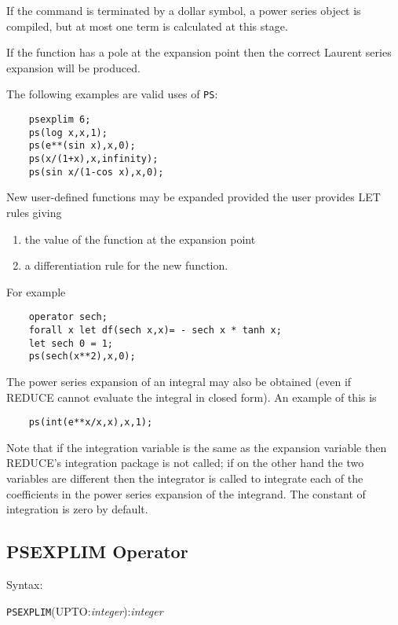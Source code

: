 If the command is terminated by a dollar symbol, a power series object
is compiled, but at most one term is calculated at this stage.

If the function has a pole at the expansion point then the correct
Laurent series expansion will be produced.

\noindent The following examples are valid uses of {\tt PS}:
\begin{verbatim}
    psexplim 6;
    ps(log x,x,1);
    ps(e**(sin x),x,0);
    ps(x/(1+x),x,infinity);
    ps(sin x/(1-cos x),x,0);
\end{verbatim}

New user-defined functions may be expanded provided the user provides
LET rules giving

\begin{enumerate}
\item the value of the function at the expansion point
\item a differentiation rule for the new function.
\end{enumerate}

\noindent For example
\begin{verbatim}
    operator sech;
    forall x let df(sech x,x)= - sech x * tanh x;
    let sech 0 = 1;
    ps(sech(x**2),x,0);
\end{verbatim}
 
The power series expansion of an integral may also be obtained (even if
REDUCE cannot evaluate the integral in closed form).  An example of
this is

\begin{verbatim}
    ps(int(e**x/x,x),x,1);
\end{verbatim}
 
Note that if the integration variable is the same as the expansion
variable then REDUCE's integration package is not called; if on the
other hand the two variables are different then the integrator is
called to integrate each of the coefficients in the power series
expansion of the integrand.  The constant of integration is zero by
default.   
 
\subsection{PSEXPLIM Operator}

Syntax:

\hspace*{2em} {\tt PSEXPLIM}(UPTO:{\em integer}):{\em integer}

